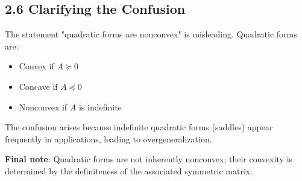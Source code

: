 \documentclass{article}
\begin{document}
\subsection*{2.6 Clarifying the Confusion}
The statement "quadratic forms are nonconvex" is misleading. Quadratic forms are:
\begin{itemize}
    \item Convex if $A \succeq 0$
    \item Concave if $A \preceq 0$
    \item Nonconvex if $A$ is indefinite
\end{itemize}
The confusion arises because indefinite quadratic forms (saddles) appear frequently in applications, leading to overgeneralization.

\textbf{Final note}: Quadratic forms are not inherently nonconvex; their convexity is determined by the definiteness of the associated symmetric matrix.
\end{document}
